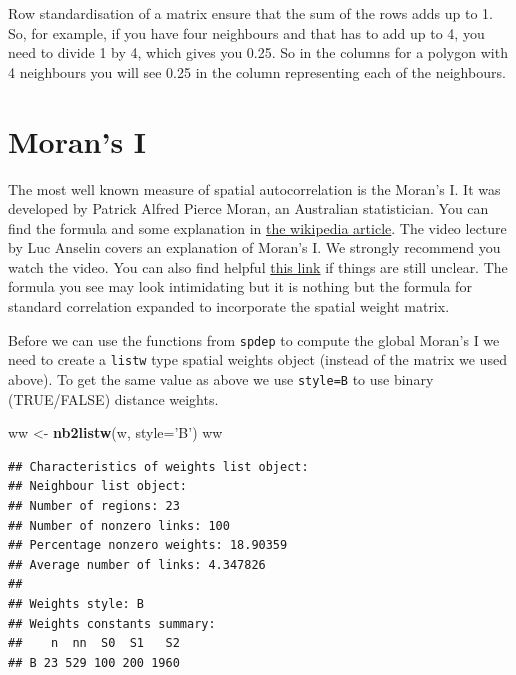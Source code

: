 \documentclass[]{book}
\newenvironment{Shaded}{\begin{snugshade}}{\end{snugshade}}
\newcommand{\DataTypeTok}[1]{\textcolor[rgb]{0.13,0.29,0.53}{#1}}
\newcommand{\KeywordTok}[1]{\textcolor[rgb]{0.13,0.29,0.53}{\textbf{#1}}}
\newcommand{\NormalTok}[1]{#1}
\newcommand{\StringTok}[1]{\textcolor[rgb]{0.31,0.60,0.02}{#1}}
\begin{document}
Row standardisation of a matrix ensure that the sum of the rows adds up to 1. So, for example, if you have four neighbours and that has to add up to 4, you need to divide 1 by 4, which gives you 0.25. So in the columns for a polygon with 4 neighbours you will see 0.25 in the column representing each of the neighbours.

\hypertarget{morans-i}{%
\section{Moran's I}\label{morans-i}}

The most well known measure of spatial autocorrelation is the Moran's I. It was developed by Patrick Alfred Pierce Moran, an Australian statistician. You can find the formula and some explanation in \href{https://en.wikipedia.org/wiki/Moran's_I}{the wikipedia article}. The video lecture by Luc Anselin covers an explanation of Moran's I. We strongly recommend you watch the video. You can also find helpful \href{https://pro.arcgis.com/en/pro-app/tool-reference/spatial-statistics/h-how-spatial-autocorrelation-moran-s-i-spatial-st.htm}{this link} if things are still unclear. The formula you see may look intimidating but it is nothing but the formula for standard correlation expanded to incorporate the spatial weight matrix.

Before we can use the functions from \texttt{spdep} to compute the global Moran's I we need to create a \texttt{listw} type spatial weights object (instead of the matrix we used above). To get the same value as above we use \texttt{style=\textquotesingle{}B\textquotesingle{}} to use binary (TRUE/FALSE) distance weights.

\begin{Shaded}
\begin{Highlighting}[]
\NormalTok{ww <-}\StringTok{  }\KeywordTok{nb2listw}\NormalTok{(w, }\DataTypeTok{style=}\StringTok{'B'}\NormalTok{)}
\NormalTok{ww}
\end{Highlighting}
\end{Shaded}

\begin{verbatim}
## Characteristics of weights list object:
## Neighbour list object:
## Number of regions: 23 
## Number of nonzero links: 100 
## Percentage nonzero weights: 18.90359 
## Average number of links: 4.347826 
## 
## Weights style: B 
## Weights constants summary:
##    n  nn  S0  S1   S2
## B 23 529 100 200 1960
\end{verbatim}
\end{document}

